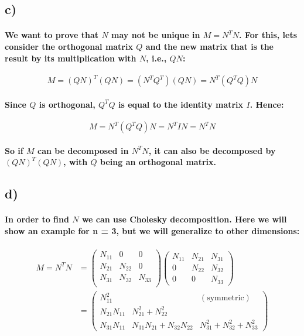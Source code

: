 \documentclass[a4paper]{article}    %
\begin{document}
\subsection*{c)}

\paragraph{We want to prove that $N$ may not be unique in $M=N^TN$. For this, lets consider the orthogonal matrix $Q$ and the new matrix that is the result by its multiplication with $N$, i.e., $QN$:}
    \[M = (QN)^T(QN) = (N^TQ^T)(QN) = N^T(Q^TQ)N\]

\paragraph{Since $Q$ is orthogonal, $Q^TQ$ is equal to the identity matrix $I$. Hence:}
    \[M= N^T(Q^TQ)N = N^TIN = N^TN\]

\paragraph{So if $M$ can be decomposed in $N^TN$, it can also be decomposed by $(QN)^T(QN)$, with $Q$ being an orthogonal matrix.}

\subsection*{d)}

\paragraph{In order to find $N$ we can use Cholesky decomposition. Here we will show an example for n = 3, but we will generalize to other dimensions:}

\begin{align*}
    M = N^TN & =
    \begin{pmatrix}   N_{11} & 0 & 0 \\
        N_{21} & N_{22} & 0 \\
        N_{31} & N_{32} & N_{33}\\
    \end{pmatrix}
    \begin{pmatrix}   N_{11} & N_{21} & N_{31} \\
        0 & N_{22} & N_{32} \\
        0 & 0 & N_{33}
    \end{pmatrix} \\
    & =
    \begin{pmatrix}   N_{11}^2 &   &(\text{symmetric})   \\
        N_{21}N_{11} & N_{21}^2 + N_{22}^2& \\
        N_{31}N_{11} & N_{31}N_{21}+N_{32}N_{22} & N_{31}^2 + N_{32}^2+N_{33}^2
    \end{pmatrix}
\end{align*}
\end{document}
